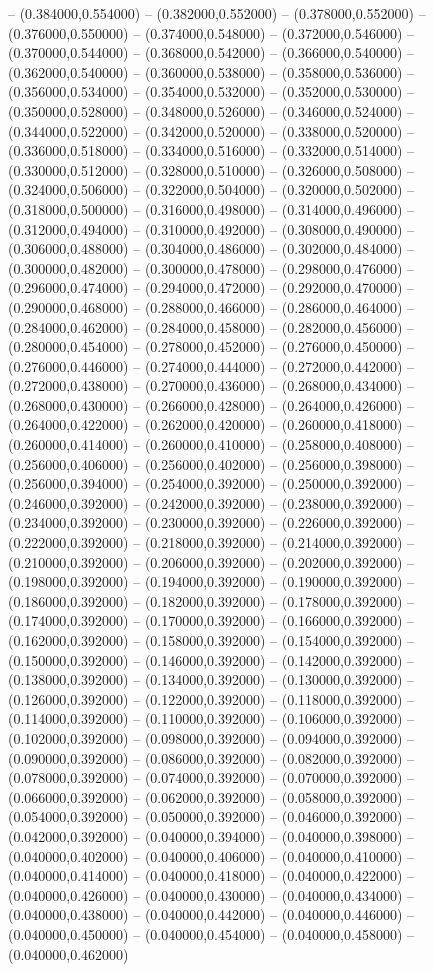 -- (0.384000,0.554000) -- (0.382000,0.552000) -- (0.378000,0.552000) -- (0.376000,0.550000) -- (0.374000,0.548000) -- (0.372000,0.546000) -- (0.370000,0.544000) -- (0.368000,0.542000) -- (0.366000,0.540000) -- (0.362000,0.540000) -- (0.360000,0.538000) -- (0.358000,0.536000) -- (0.356000,0.534000) -- (0.354000,0.532000) -- (0.352000,0.530000) -- (0.350000,0.528000) -- (0.348000,0.526000) -- (0.346000,0.524000) -- (0.344000,0.522000) -- (0.342000,0.520000) -- (0.338000,0.520000) -- (0.336000,0.518000) -- (0.334000,0.516000) -- (0.332000,0.514000) -- (0.330000,0.512000) -- (0.328000,0.510000) -- (0.326000,0.508000) -- (0.324000,0.506000) -- (0.322000,0.504000) -- (0.320000,0.502000) -- (0.318000,0.500000) -- (0.316000,0.498000) -- (0.314000,0.496000) -- (0.312000,0.494000) -- (0.310000,0.492000) -- (0.308000,0.490000) -- (0.306000,0.488000) -- (0.304000,0.486000) -- (0.302000,0.484000) -- (0.300000,0.482000) -- (0.300000,0.478000) -- (0.298000,0.476000) -- (0.296000,0.474000) -- (0.294000,0.472000) -- (0.292000,0.470000) -- (0.290000,0.468000) -- (0.288000,0.466000) -- (0.286000,0.464000) -- (0.284000,0.462000) -- (0.284000,0.458000) -- (0.282000,0.456000) -- (0.280000,0.454000) -- (0.278000,0.452000) -- (0.276000,0.450000) -- (0.276000,0.446000) -- (0.274000,0.444000) -- (0.272000,0.442000) -- (0.272000,0.438000) -- (0.270000,0.436000) -- (0.268000,0.434000) -- (0.268000,0.430000) -- (0.266000,0.428000) -- (0.264000,0.426000) -- (0.264000,0.422000) -- (0.262000,0.420000) -- (0.260000,0.418000) -- (0.260000,0.414000) -- (0.260000,0.410000) -- (0.258000,0.408000) -- (0.256000,0.406000) -- (0.256000,0.402000) -- (0.256000,0.398000) -- (0.256000,0.394000) -- (0.254000,0.392000) -- (0.250000,0.392000) -- (0.246000,0.392000) -- (0.242000,0.392000) -- (0.238000,0.392000) -- (0.234000,0.392000) -- (0.230000,0.392000) -- (0.226000,0.392000) -- (0.222000,0.392000) -- (0.218000,0.392000) -- (0.214000,0.392000) -- (0.210000,0.392000) -- (0.206000,0.392000) -- (0.202000,0.392000) -- (0.198000,0.392000) -- (0.194000,0.392000) -- (0.190000,0.392000) -- (0.186000,0.392000) -- (0.182000,0.392000) -- (0.178000,0.392000) -- (0.174000,0.392000) -- (0.170000,0.392000) -- (0.166000,0.392000) -- (0.162000,0.392000) -- (0.158000,0.392000) -- (0.154000,0.392000) -- (0.150000,0.392000) -- (0.146000,0.392000) -- (0.142000,0.392000) -- (0.138000,0.392000) -- (0.134000,0.392000) -- (0.130000,0.392000) -- (0.126000,0.392000) -- (0.122000,0.392000) -- (0.118000,0.392000) -- (0.114000,0.392000) -- (0.110000,0.392000) -- (0.106000,0.392000) -- (0.102000,0.392000) -- (0.098000,0.392000) -- (0.094000,0.392000) -- (0.090000,0.392000) -- (0.086000,0.392000) -- (0.082000,0.392000) -- (0.078000,0.392000) -- (0.074000,0.392000) -- (0.070000,0.392000) -- (0.066000,0.392000) -- (0.062000,0.392000) -- (0.058000,0.392000) -- (0.054000,0.392000) -- (0.050000,0.392000) -- (0.046000,0.392000) -- (0.042000,0.392000) -- (0.040000,0.394000) -- (0.040000,0.398000) -- (0.040000,0.402000) -- (0.040000,0.406000) -- (0.040000,0.410000) -- (0.040000,0.414000) -- (0.040000,0.418000) -- (0.040000,0.422000) -- (0.040000,0.426000) -- (0.040000,0.430000) -- (0.040000,0.434000) -- (0.040000,0.438000) -- (0.040000,0.442000) -- (0.040000,0.446000) -- (0.040000,0.450000) -- (0.040000,0.454000) -- (0.040000,0.458000) -- (0.040000,0.462000) 